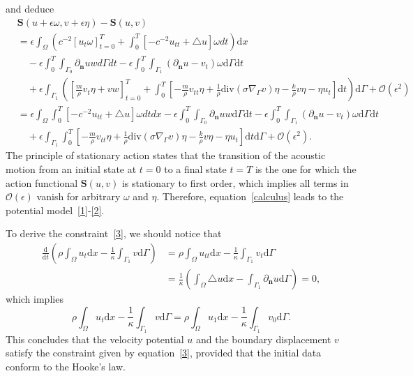 \documentclass[10pt]{elsarticle}
\begin{document}
and deduce
\begin{equation}\label{calculus}
\begin{split}
&\mathbf{S}(u+\epsilon\omega, v+\epsilon\eta) - \mathbf{S}(u, v)\\
&= \epsilon\int_{\Omega} \left(c^{-2}[u_t\omega]^{T}_{t=0} + \int_{0}^{T}\left[ -c^{-2}u_{tt} + \triangle u\right]\omega dt\right)\mathrm{d}x\\
&\quad - \epsilon\int_{0}^{T}\int_{\Gamma_0}\partial_{\mathbf{ n}}u w d\Gamma dt - \epsilon\int_{0}^{T}\int_{\Gamma_1}\left(\partial_{\mathbf{ n}}u - v_t\right)\omega \mathrm{d}\Gamma \mathrm{d}t\\
&\quad+\epsilon\int_{\Gamma_1}\left([\frac{m}{\rho} v_t\eta + v w]^{T}_{t=0} + \int_{0}^{T}\left[ -\frac{m}{\rho} v_{tt}\eta + \frac{1}{\rho}\mathrm{div}(\sigma\nabla_{\Gamma}v)\eta - \frac{k}{\rho} v\eta - \eta u_t  \right]\mathrm{d}t\right)\mathrm{d}\Gamma +\mathcal{O}(\epsilon^2)\\
&= \epsilon\int_{\Omega}\int_{0}^{T}\left[ -c^{-2}u_{tt} + \triangle u\right]\omega dtdx - \epsilon\int_{0}^{T}\int_{\Gamma_0}\partial_{\mathbf{ n}}u w \mathrm{d}\Gamma \mathrm{d}t - \epsilon\int_{0}^{T}\int_{\Gamma_1}\left(\partial_{\mathbf{ n}}u - v_t\right)\omega \mathrm{d}\Gamma \mathrm{d}t\\
&\quad+\epsilon\int_{\Gamma_1}\int_{0}^{T}\left[ -\frac{m}{\rho} v_{tt}\eta + \frac{1}{\rho}\mathrm{div}(\sigma\nabla_{\Gamma}v)\eta - \frac{k}{\rho} v\eta - \eta u_t  \right]\mathrm{d}t\mathrm{d}\Gamma +\mathcal{O}(\epsilon^2).
\end{split}
\end{equation}
The principle of stationary action states that the transition of the acoustic motion from an initial state at $t=0$ to a final state $t=T$ is the one for which the action functional $\mathbf{S}(u, v)$ is stationary to first order, which implies all terms in $\mathcal{O}(\epsilon)$ vanish for arbitrary $\omega$ and $\eta$. Therefore, equation~\eqref{calculus} leads to the potential model~\eqref{1}-\eqref{2}.

To derive the constraint~\eqref{3}, we should notice that
\begin{equation*} 
\begin{split}
	\frac{\mathrm{d}}{\mathrm{d}t}\left(\rho\int_{\Omega}u_t \mathrm{d}x - \frac{1}{\kappa}\int_{\Gamma_1}v \mathrm{d}\Gamma \right) &= \rho\int_{\Omega}u_{tt} \mathrm{d}x - \frac{1}{\kappa}\int_{\Gamma_1}v_t \mathrm{d}\Gamma\\
	&= \frac{1}{\kappa}\left(\int_{\Omega}\triangle u \mathrm{d}x - \int_{\Gamma_1}\partial_{\mathbf{n}}u \mathrm{d}\Gamma\right) =0,
\end{split}
\end{equation*}
which implies
\begin{equation}\label{Hooke} 
	\rho\int_{\Omega}u_t \mathrm{d}x - \frac{1}{\kappa}\int_{\Gamma_1}v \mathrm{d}\Gamma = \rho\int_{\Omega}u_1 \mathrm{d}x - \frac{1}{\kappa}\int_{\Gamma_1}v_0 \mathrm{d}\Gamma.
\end{equation}
This concludes that the velocity potential $u$ and the boundary displacement $v$ satisfy the constraint given by equation~\eqref{3}, provided that the initial data conform to the Hooke's law.
\end{document}
